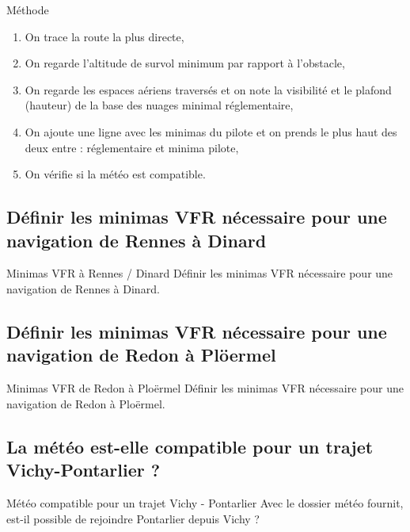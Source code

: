 \documentclass{beamer}
\begin{document}
\begin{frame}{Méthode}
  \begin{enumerate}
    \item On trace la route la plus directe, \pause
    \item On regarde l'altitude de survol minimum par rapport à l'obstacle, \pause
    \item On regarde les espaces aériens traversés et on note la visibilité et le plafond (hauteur) de la base des nuages minimal réglementaire, \pause
    \item On ajoute une ligne avec les minimas du pilote et on prends le plus haut des deux entre : réglementaire et minima pilote, \pause
    \item On vérifie si la météo est compatible.
  \end{enumerate}
\end{frame}

\subsection{Définir les minimas VFR nécessaire pour une navigation de Rennes à Dinard}

\begin{frame}{Minimas VFR à Rennes / Dinard}
  Définir les minimas VFR nécessaire pour une navigation de Rennes à Dinard.
\end{frame}

\subsection{Définir les minimas VFR nécessaire pour une navigation de Redon à Plöermel}
\begin{frame}{Minimas VFR de Redon à Ploërmel}
  Définir les minimas VFR nécessaire pour une navigation de Redon à Ploërmel.
\end{frame}

\subsection{La météo est-elle compatible pour un trajet Vichy-Pontarlier ?}
\begin{frame}{Météo compatible pour un trajet Vichy - Pontarlier}
  Avec le dossier météo fournit, est-il possible de rejoindre Pontarlier depuis Vichy ?
\end{frame}
\end{document}
